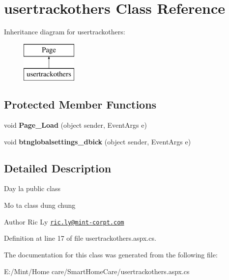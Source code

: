 \hypertarget{classusertrackothers}{\section{usertrackothers Class Reference}
\label{classusertrackothers}
}
Inheritance diagram for usertrackothers\-:\begin{figure}[H]
\begin{center}
\leavevmode
\includegraphics[height=2.000000cm]{classusertrackothers}
\end{center}
\end{figure}
\subsection*{Protected Member Functions}
\begin{DoxyCompactItemize}
\item 
\hypertarget{classusertrackothers_ab77140972e944fe56cee5e9438c2db79}{void {\bfseries Page\-\_\-\-Load} (object sender, Event\-Args e)}\label{classusertrackothers_ab77140972e944fe56cee5e9438c2db79}

\item 
\hypertarget{classusertrackothers_ac0ad32bc270056854f1baca4942135a3}{void {\bfseries btnglobalsettings\-\_\-dbick} (object sender, Event\-Args e)}\label{classusertrackothers_ac0ad32bc270056854f1baca4942135a3}

\end{DoxyCompactItemize}


\subsection{Detailed Description}
Day la public class

Mo ta class dung chung \begin{DoxyAuthor}{Author}
Ric Ly \href{mailto:ric.ly@mint-corpt.com}{\tt ric.\-ly@mint-\/corpt.\-com} 
\end{DoxyAuthor}


Definition at line 17 of file usertrackothers.\-aspx.\-cs.



The documentation for this class was generated from the following file\-:\begin{DoxyCompactItemize}
\item 
E\-:/\-Mint/\-Home care/\-Smart\-Home\-Care/usertrackothers.\-aspx.\-cs\end{DoxyCompactItemize}
